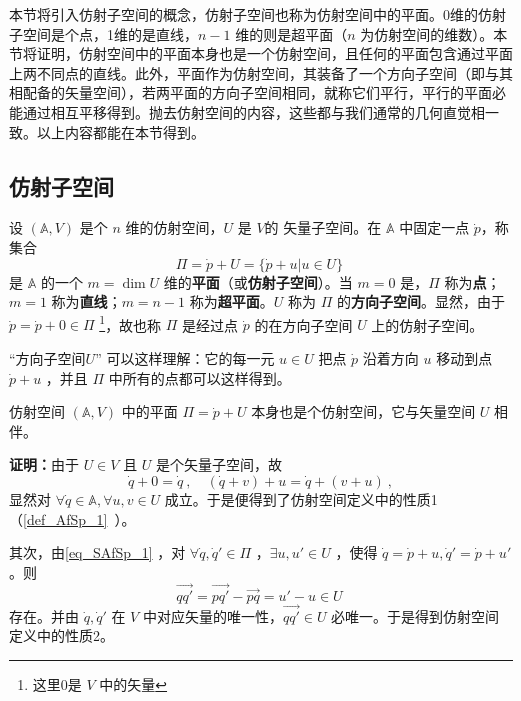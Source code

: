 
\begin{issues}
\end{issues}

本节将引入仿射子空间的概念，仿射子空间也称为仿射空间中的平面。0维的仿射子空间是个点，1维的是直线，$n-1$ 维的则是超平面（$n$ 为仿射空间的维数）。本节将证明，仿射空间中的平面本身也是一个仿射空间，且任何的平面包含通过平面上两不同点的直线。此外，平面作为仿射空间，其装备了一个方向子空间（即与其相配备的矢量空间），若两平面的方向子空间相同，就称它们平行，平行的平面必能通过相互平移得到。抛去仿射空间的内容，这些都与我们通常的几何直觉相一致。以上内容都能在本节得到。
\subsection{仿射子空间}
\begin{definition}{}\label{def_SAfSp_1}
设 $(\mathbb A,V)$ 是个 $n$ 维的仿射空间，$U$ 是 $V$的 矢量子空间。在 $\mathbb A$ 中固定一点 $\dot p$，称集合
\begin{equation}\label{eq_SAfSp_1}
\Pi=\dot p+U=\{\dot p+u|u\in U\}~
\end{equation}
是 $\mathbb A$ 的一个 $m=\dim U$ 维的\textbf{平面}（或\textbf{仿射子空间}）。当 $m=0$ 是，$\Pi$ 称为\textbf{点}；$m=1$ 称为\textbf{直线}；$m=n-1$ 称为\textbf{超平面}。$U$ 称为 $\Pi$ 的\textbf{方向子空间}。显然，由于 $\dot p=\dot p+0\in \Pi$ \footnote{这里0是 $V$ 中的矢量}，故也称 $\Pi$ 是经过点 $\dot p$ 的在方向子空间 $U$ 上的仿射子空间。
\end{definition}
“方向子空间$U$” 可以这样理解：它的每一元 $u\in U$ 把点 $\dot p$ 沿着方向 $u$ 移动到点 $\dot p+u$ ，并且 $\Pi$ 中所有的点都可以这样得到。

\begin{theorem}{}
仿射空间 $(\mathbb A,V)$ 中的平面 $\Pi=\dot p+U$ 本身也是个仿射空间，它与矢量空间 $U$ 相伴。
\end{theorem}
\textbf{证明：}由于 $U\in V$ 且 $U$ 是个矢量子空间，故
\begin{equation}
\dot q+0=\dot q~,\quad (\dot q+v)+u=\dot q+(v+u)~,
\end{equation}
显然对 $\forall \dot q\in\mathbb A,\forall u,v\in U$ 成立。于是便得到了仿射空间定义中的性质1（\autoref{def_AfSp_1}~）。

其次，由\autoref{eq_SAfSp_1} ，对 $\forall \dot q,\dot q'\in\Pi$ ，$\exists u,u'\in U$ ，使得 $\dot q=\dot p+u,\dot q'=\dot p+u'$。则
\begin{equation}
\overrightarrow{qq'}=\overrightarrow{pq'}-\overrightarrow{pq}=u'-u\in U~
\end{equation}
存在。并由 $\dot q,\dot q'$ 在 $V$ 中对应矢量的唯一性，$\overrightarrow{qq'}\in U$ 必唯一。于是得到仿射空间定义中的性质2。

